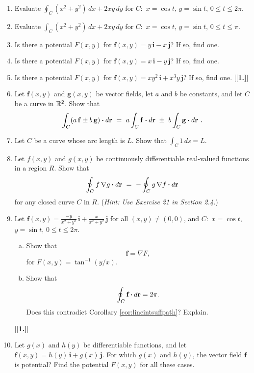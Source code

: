 \begin{enumerate}[\bfseries 1.]
 \item Evaluate $\displaystyle\oint_C (x^2 + y^2 )\,dx + 2xy\,dy$ for $C:$ $x=\cos t$, $y=\sin t$, $0\le t\le 2\pi$.
 \item Evaluate $\displaystyle\int_C (x^2 + y^2 )\,dx + 2xy\,dy$ for $C:$ $x=\cos t$, $y=\sin t$, $0\le t\le \pi$.
 \item Is there a potential $F(x,y)$ for $\mathbf{f}(x,y) = y\,\mathbf{i} - x\,\mathbf{j}$? If so, find one.
 \item Is there a potential $F(x,y)$ for $\mathbf{f}(x,y) = x\,\mathbf{i} - y\,\mathbf{j}$? If so, find one.
 \item Is there a potential $F(x,y)$ for $\mathbf{f}(x,y) = xy^2\,\mathbf{i} + x^3 y\,\mathbf{j}$? If so, find
  one.
[{[\bfseries 1.]}]
 \item Let $\mathbf{f}(x,y)$ and $\mathbf{g}(x,y)$ be vector fields, let $a$ and $b$ be constants, and let $C$ be
  a curve in $\mathbb{R}^{2}$. Show that
  \begin{displaymath}
   \int_{C}(a\,\mathbf{f} \pm b\,\mathbf{g}) \bm{\cdot} d\mathbf{r} ~=~ a \int_{C}\mathbf{f} \bm{\cdot} d\mathbf{r} ~\pm~
   b \int_{C}\mathbf{g} \bm{\cdot} d\mathbf{r} ~.
  \end{displaymath}
 \item Let $C$ be a curve whose arc length is $L$. Show that $\int_C 1\,ds = L$.
 \item Let $f(x,y)$ and $g(x,y)$ be continuously differentiable real-valued functions in a region $R$. Show that
  \begin{displaymath}
   \oint_{C}f\,\nabla g \bm{\cdot} d\mathbf{r} ~=~ -\oint_{C}g\,\nabla f \bm{\cdot} d\mathbf{r}
  \end{displaymath}
  for any closed curve $C$ in $R$. (\emph{Hint: Use Exercise 21 in Section 2.4.})
 \item Let $\mathbf{f}(x,y)=\frac{-y}{x^2 + y^2}\,\mathbf{i} + \frac{x}{x^2 + y^2}\,\mathbf{j}$ for all $(x,y)\ne(0,0)$,
  and $C:$ $x=\cos t$, $y=\sin t$, $0\le t\le 2\pi$.
  \begin{enumerate}[(a)]
   \item Show that \[\mathbf{f} = \nabla F,\] for $F(x,y) = \tan^{-1}(y/x)$.
   \item Show that \[\oint_{C} \textbf{f} \bm{\cdot} d\textbf{r} = 2\pi.\] Does this contradict Corollary
    \ref{cor:lineintsuffpath}? Explain.
  \end{enumerate}
[{[\bfseries 1.]}]
 \item Let $g(x)$ and $h(y)$ be differentiable functions, and let $\mathbf{f}(x,y)=h(y)\,\mathbf{i} + g(x)\,\mathbf{j}$.
For which $g(x)$ and $h(y)$, the vector field $\mathbf{f}$ is potential? 
Find the potential $F(x,y)$ for all these cases. 
\end{enumerate}
\newpage
